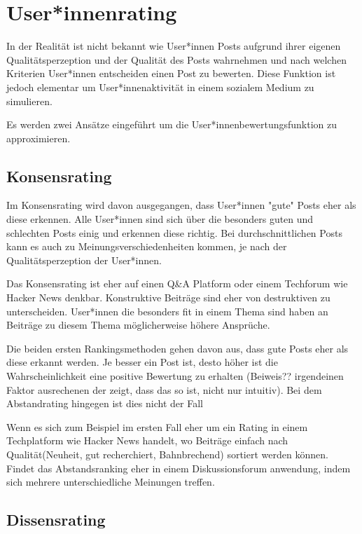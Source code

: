 \chapter{User*innenrating}

In der Realität ist nicht bekannt wie User*innen Posts aufgrund ihrer eigenen Qualitätsperzeption und der Qualität des Posts wahrnehmen und nach welchen Kriterien User*innen entscheiden einen Post zu bewerten. Diese Funktion ist jedoch elementar um User*innenaktivität in einem sozialem Medium zu simulieren. 

Es werden zwei Ansätze eingeführt um die User*innenbewertungsfunktion zu approximieren.
 
 
\section{Konsensrating}

Im Konsensrating wird davon ausgegangen, dass User*innen "gute" Posts eher als diese erkennen. Alle User*innen sind sich über die besonders guten und schlechten Posts einig und erkennen diese richtig. Bei durchschnittlichen Posts kann es auch zu Meinungsverschiedenheiten kommen, je nach der Qualitätsperzeption der User*innen.

Das Konsensrating ist eher auf einen Q\&A Platform oder einem Techforum wie Hacker News denkbar. Konstruktive Beiträge sind eher von destruktiven zu unterscheiden. User*innen die besonders fit in einem Thema sind haben an Beiträge zu diesem Thema möglicherweise höhere Ansprüche.


Die beiden ersten Rankingsmethoden gehen davon aus, dass gute Posts eher als diese erkannt werden. Je besser ein Post ist, desto höher ist die Wahrscheinlichkeit eine positive Bewertung zu erhalten (Beiweis?? irgendeinen Faktor ausrechenen der zeigt, dass das so ist, nicht nur intuitiv). Bei dem Abstandrating hingegen ist dies nicht der Fall

Wenn es sich zum Beispiel im ersten Fall eher um ein Rating in einem Techplatform wie Hacker News handelt, wo Beiträge einfach nach Qualität(Neuheit, gut recherchiert, Bahnbrechend) sortiert werden können.  Findet das Abstandsranking eher in einem Diskussionsforum anwendung, indem sich mehrere unterschiedliche Meinungen treffen.

\section{Dissensrating}

